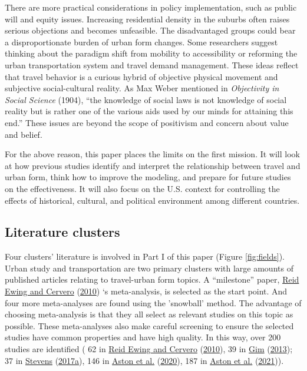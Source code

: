 \documentclass[
  12pt,
]{article}
\begin{document}
There are more practical considerations in policy implementation, such as public will and equity issues.
Increasing residential density in the suburbs often raises serious objections and becomes unfeasible.
The disadvantaged groups could bear a disproportionate burden of urban form changes.
Some researchers suggest thinking about the paradigm shift from mobility to accessibility or reforming the urban transportation system and travel demand management.
These ideas reflect that travel behavior is a curious hybrid of objective physical movement and subjective social-cultural reality.
As Max Weber mentioned in \emph{Objectivity in Social Science} (1904), ``the knowledge of social laws is not knowledge of social reality but is rather one of the various aids used by our minds for attaining this end.'' These issues are beyond the scope of positivism and concern about value and belief.

For the above reason, this paper places the limits on the first mission.
It will look at how previous studies identify and interpret the relationship between travel and urban form, think how to improve the modeling, and prepare for future studies on the effectiveness.
It will also focus on the U.S. context for controlling the effects of historical, cultural, and political environment among different countries.

\hypertarget{literature-clusters}{%
\subsection{Literature clusters}\label{literature-clusters}}

Four clusters' literature is involved in Part I of this paper (Figure \ref{fig:fields}).
Urban study and transportation are two primary clusters with large amounts of published articles relating to travel-urban form topics.
A ``milestone'' paper, \protect\hyperlink{ref-ewingTravelBuiltEnvironment2010}{Reid Ewing and Cervero} (\protect\hyperlink{ref-ewingTravelBuiltEnvironment2010}{2010}) `s meta-analysis, is selected as the start point.
And four more meta-analyses are found using the 'snowball' method.
The advantage of choosing meta-analysis is that they all select as relevant studies on this topic as possible.
These meta-analyses also make careful screening to ensure the selected studies have common properties and have high quality.
In this way, over 200 studies are identified ( 62 in \protect\hyperlink{ref-ewingTravelBuiltEnvironment2010}{Reid Ewing and Cervero} (\protect\hyperlink{ref-ewingTravelBuiltEnvironment2010}{2010}), 39 in \protect\hyperlink{ref-gimRelationshipsLandUse2013}{Gim} (\protect\hyperlink{ref-gimRelationshipsLandUse2013}{2013}); 37 in \protect\hyperlink{ref-stevensDoesCompactDevelopment2017}{Stevens} (\protect\hyperlink{ref-stevensDoesCompactDevelopment2017}{2017a}), 146 in \protect\hyperlink{ref-astonStudyDesignImpacts2020}{Aston et al.} (\protect\hyperlink{ref-astonStudyDesignImpacts2020}{2020}), 187 in \protect\hyperlink{ref-astonExploringBuiltEnvironment2021}{Aston et al.} (\protect\hyperlink{ref-astonExploringBuiltEnvironment2021}{2021})).
\end{document}
